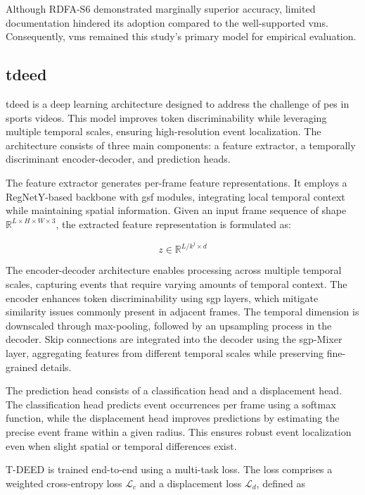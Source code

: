 Although RDFA-S6 demonstrated marginally superior accuracy, limited documentation hindered its adoption compared to the well-supported \acrlong{vms}. Consequently, \acrshort{vms} remained this study's primary model for empirical evaluation. 


\subsection{\acrfull{tdeed}}
\label{ssec:tdeed}

\acrfull{tdeed} is a deep learning architecture designed to address the challenge of \acrfull{pes} in sports videos. This model improves token discriminability while leveraging multiple temporal scales, ensuring high-resolution event localization. The architecture consists of three main components: a feature extractor, a temporally discriminant encoder-decoder, and prediction heads\cite{xarles_t-deed_2024}.

The feature extractor generates per-frame feature representations. It employs a RegNetY-based backbone with \acrfull{gsf} modules, integrating local temporal context while maintaining spatial information. Given an input frame sequence of shape \(\mathbb{R}^{L \times H \times W \times 3}\), the extracted feature representation is formulated as:

\[
z \in \mathbb{R}^{L/{k^j \times d} }
\]

The encoder-decoder architecture enables processing across multiple temporal scales, capturing events that require varying amounts of temporal context. The encoder enhances token discriminability using \acrfull{sgp} layers, which mitigate similarity issues commonly present in adjacent frames. The temporal dimension is downscaled through max-pooling, followed by an upsampling process in the decoder. Skip connections are integrated into the decoder using the \acrshort{sgp}-Mixer layer, aggregating features from different temporal scales while preserving fine-grained details.

The prediction head consists of a classification head and a displacement head. The classification head predicts event occurrences per frame using a softmax function, while the displacement head improves predictions by estimating the precise event frame within a given radius. This ensures robust event localization even when slight spatial or temporal differences exist.


T-DEED is trained end-to-end using a multi-task loss. The loss comprises a weighted cross-entropy loss \(\mathcal{L}_c\) and a displacement loss \(\mathcal{L}_d\), defined as

